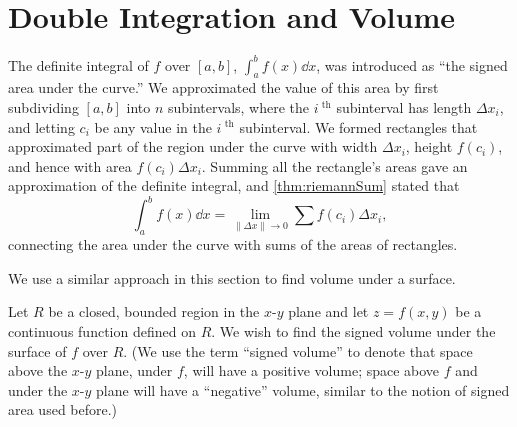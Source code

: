 \section{Double Integration and Volume}\label{sec:double_int_volume}

The definite integral of $f$ over $[a,b]$, $\int_a^b f(x)\dd x$, was introduced as ``the signed area under the curve.'' We approximated the value of this area by first subdividing $[a,b]$ into $n$ subintervals, where the $i^\text{ th}$ subinterval has length $\Delta x_i$, and letting $c_i$ be any value in the $i^\text{ th}$ subinterval. We formed rectangles that approximated part of the region under the curve with width $\Delta x_i$, height $f(c_i)$, and hence with area $f(c_i)\Delta x_i$. Summing all the rectangle's areas gave an approximation of the definite integral, and \autoref{thm:riemannSum} stated that
\[\int_a^bf(x)\dd x = \lim_{\|\Delta x\|\to 0}\sum f(c_i)\Delta x_i,\]
connecting the area under the curve with sums of the areas of rectangles.\bigskip

We use a similar approach in this section to find volume under a surface.\bigskip

Let $R$ be a closed, bounded region in the $x$-$y$ plane and let $z=f(x,y)$ be a continuous function defined on $R$. We wish to find the signed volume under the surface of $f$ over $R$. (We use the term ``signed volume'' to denote that space above the $x$-$y$ plane, under $f$, will have a positive volume; space above $f$ and under the $x$-$y$ plane will have a ``negative'' volume, similar to the notion of signed area used before.)


